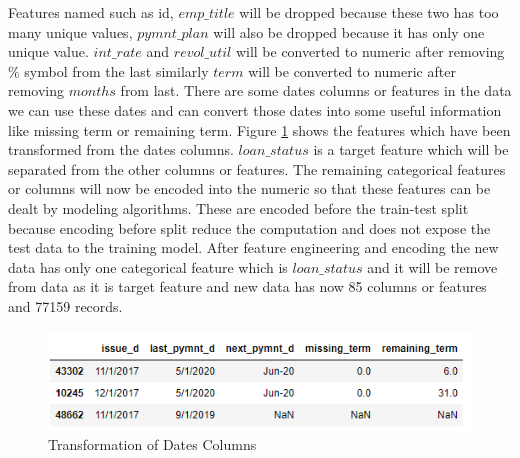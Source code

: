 \documentclass[12pt]{article}
\begin{document}
 Features named such as id, $emp\_title$ will be dropped because these two has too many unique values, $pymnt\_plan$ will also be dropped because it has only one unique value. $int\_rate$ and $revol\_util$ will be converted to numeric after removing $\%$ symbol from the last similarly $term$ will be converted to numeric after removing $months$ from last. There are some dates columns or features in the data we can use these dates and can convert those dates into some useful information like missing term or remaining term. Figure \ref{fig:dates} shows the features which have been transformed from the dates columns. $loan\_status$ is a target feature which will be separated from the other columns or features. The remaining categorical features or columns will now be encoded into the numeric so that these features can be dealt by modeling algorithms. These are encoded before the train-test split because encoding before split reduce the computation and does not expose the test data to the training model. After feature engineering and encoding the new data has only one categorical feature which is $loan\_status$ and it will be remove from data as it is target feature and new data has now 85 columns or features and 77159 records.

\begin{figure}[h!]
	\centering
	\includegraphics{dates.png}
	\caption{Transformation of Dates Columns}
	\label{fig:dates}
\end{figure}
\end{document}
